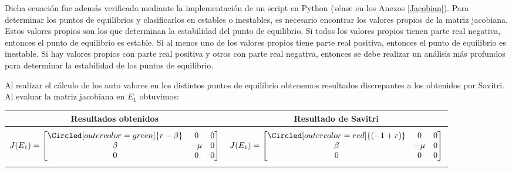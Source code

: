 \documentclass{wscpaperproc}
\theoremstyle{wsc}
\begin{document}
Dicha ecuación fue además verificada mediante la implementaci\'on de un script en Python (v\'ease en los Anexos \ref{Jacobian}).
Para determinar los puntos de equilibrios y clasificarlos en estables o inestables, es necesario encontrar los valores propios
de la matriz jacobiana. Estos valores propios son los que determinan la estabilidad del punto de equilibrio. Si todos los valores
propios tienen parte real negativa, entonces el punto de equilibrio es estable. Si al menos uno de los valores propios tiene parte real positiva,
entonces el punto de equilibrio es inestable. Si hay valores propios con parte real positiva y otros con parte real negativa,
entonces se debe realizar un análisis más profundos para determinar la estabilidad de los puntos de equilibrio. \par
Al realizar el c\'alculo de los auto valores en los distintos puntos de equilibrio obtenemos resultados discrepantes a los obtenidos por Savitri.
Al evaluar la matriz jacobiana en $E_1$ obtuvimos:
\begin{center}
	\begin{tabular}{ c c }
		\toprule
		\textbf{Resultados obtenidos}                        & \textbf{Resultado de Savitri} \\
		\midrule                                                                             \\
		\addlinespace[-2ex]
		$J(E_1) =\label{Characteristic000t} \begin{bmatrix}
				                                    \Circled[outer color=green]{r-\beta} & 0    & 0 \\
				                                    \beta                                & -\mu & 0 \\
				                                    0                                    & 0    & 0
			                                    \end{bmatrix}$ &
		$J(E_1) =\label{Characteristic000f} \begin{bmatrix}
				                                    \Circled[outer color=red]{(-1+ r) } & 0    & 0 \\
				                                    \beta                               & -\mu & 0 \\
				                                    0                                   & 0    & 0
			                                    \end{bmatrix}$   \\
		\addlinespace[1.5ex]

		\bottomrule
	\end{tabular}
\end{center}
\end{document}
